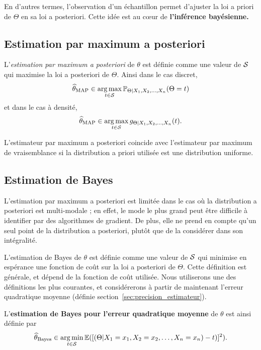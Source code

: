 En d'autres termes, l'observation d'un échantillon permet d'ajuster la loi a
priori de $\Theta$ en sa loi a posteriori. Cette idée est au c\oe{}ur
de \textbf{l'inférence bayésienne.}

\subsection{Estimation par maximum a posteriori}

L'\textit{estimation par maximum a posteriori} de $\theta$ est définie comme
une valeur de $\mathcal{S}$ qui maximise la loi a posteriori de $\Theta$. Ainsi dans
le cas discret,
\begin{equation}
  \label{eq:map_discret}
  \widehat{\theta}_{\text{MAP}} \in \operatorname*{arg\,max}_{t \in \mathcal{S}} \mathbb{P}_{\Theta|X_1, X_2, \dots, X_n}(\Theta=t)
\end{equation}
et dans le cas à densité,
\begin{equation}
  \label{eq:map_densite}
  \widehat{\theta}_{\text{MAP}} \in \operatorname*{arg\,max}_{t \in \mathcal{S}} g_{\Theta|X_1, X_2, \dots, X_n}(t).
\end{equation}
   
L'estimateur par maximum a posteriori coincide avec l'estimateur par
maximum de vraisemblance si la distribution a priori utilisée est une
distribution uniforme.
  

\subsection{Estimation de Bayes}
L'estimation par maximum a posteriori est limitée dans le cas où la
distribution a posteriori est multi-modale ; en effet, le mode le plus grand
peut être difficile à identifier par des algorithmes de gradient. De plus, elle
ne prend en compte qu'un seul point de la distribution a posteriori, plutôt que
de la considérer dans son intégralité.

L'estimation de Bayes de $\theta$ est définie comme une valeur de $\mathcal{S}$ qui
minimise en espérance une fonction de coût sur la loi a posteriori de $\Theta$.
Cette définition est
générale, et dépend de la fonction de coût utilisée. %
Nous utiliserons
une des définitions les plus courantes, et considérerons à partir de maintenant
l'erreur quadratique moyenne (définie section~\ref{sec:precision_estimateur}). 

L'\textbf{estimation de Bayes pour l'erreur quadratique moyenne} de $\theta$
est ainsi définie par
\begin{equation}
  \label{eq:bayes_estimator}
  \widehat{\theta}_{\text{Bayes}} \in \operatorname*{arg\,min}_{t \in \mathcal{S}} \mathbb{E}([(\Theta|X_1=x_1, X_2=x_2, \dots, X_n=x_n) - t)]^2).
\end{equation}



